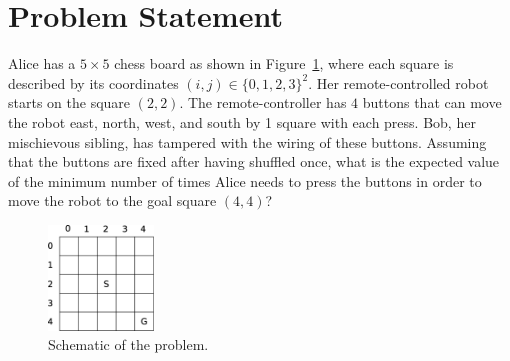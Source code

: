 \section{Problem Statement}
\label{sec:problem}
%
Alice has a $5 \times 5$ chess board as shown in Figure~\ref{fig:problem}, where
each square is described by its coordinates $(i, j) \in \{0, 1, 2, 3\}^2$. Her
remote-controlled robot starts on the square $(2,2)$. The remote-controller has
$4$ buttons that can move the robot east, north, west, and south by 1 square
with each press. Bob, her mischievous sibling, has tampered with the wiring of
these buttons. Assuming that the buttons are fixed after having shuffled once,
what is the expected value of the minimum number of times Alice needs to press
the buttons in order to move the robot to the goal square $(4,4)$?

\begin{figure}[bth]
    \centering
    \includegraphics[width=0.25\textwidth]{./figures/drawing_v1.eps}
    \caption{Schematic of the problem.}
    \label{fig:problem}
\end{figure}